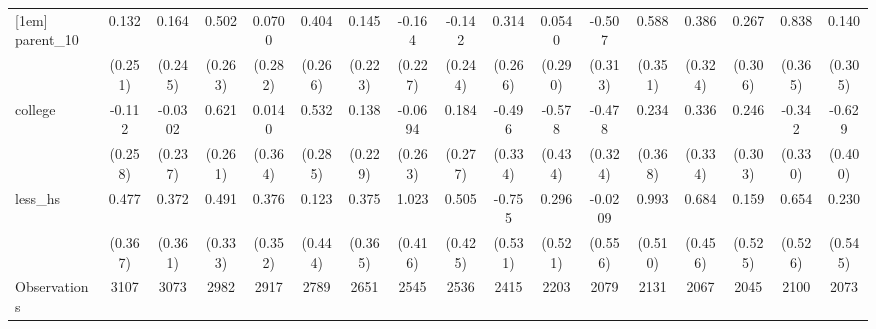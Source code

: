 {\begin{tabular}{l*{16}{c}}
[1em]
parent\_10           &       0.132         &       0.164         &       0.502         &      0.0700         &       0.404         &       0.145         &      -0.164         &      -0.142         &       0.314         &      0.0540         &      -0.507         &       0.588         &       0.386         &       0.267         &       0.838\sym{*}  &       0.140         \\
                    &     (0.251)         &     (0.245)         &     (0.263)         &     (0.282)         &     (0.266)         &     (0.223)         &     (0.227)         &     (0.244)         &     (0.266)         &     (0.290)         &     (0.313)         &     (0.351)         &     (0.324)         &     (0.306)         &     (0.365)         &     (0.305)         \\
[1em]
college             &      -0.112         &     -0.0302         &       0.621\sym{*}  &      0.0140         &       0.532         &       0.138         &     -0.0694         &       0.184         &      -0.496         &      -0.578         &      -0.478         &       0.234         &       0.336         &       0.246         &      -0.342         &      -0.629         \\
                    &     (0.258)         &     (0.237)         &     (0.261)         &     (0.364)         &     (0.285)         &     (0.229)         &     (0.263)         &     (0.277)         &     (0.334)         &     (0.434)         &     (0.324)         &     (0.368)         &     (0.334)         &     (0.303)         &     (0.330)         &     (0.400)         \\
[1em]
less\_hs             &       0.477         &       0.372         &       0.491         &       0.376         &       0.123         &       0.375         &       1.023\sym{*}  &       0.505         &      -0.755         &       0.296         &     -0.0209         &       0.993         &       0.684         &       0.159         &       0.654         &       0.230         \\
                    &     (0.367)         &     (0.361)         &     (0.333)         &     (0.352)         &     (0.444)         &     (0.365)         &     (0.416)         &     (0.425)         &     (0.531)         &     (0.521)         &     (0.556)         &     (0.510)         &     (0.456)         &     (0.525)         &     (0.526)         &     (0.545)         \\
\hline
Observations        &        3107         &        3073         &        2982         &        2917         &        2789         &        2651         &        2545         &        2536         &        2415         &        2203         &        2079         &        2131         &        2067         &        2045         &        2100         &        2073         \\

\end{tabular}}
